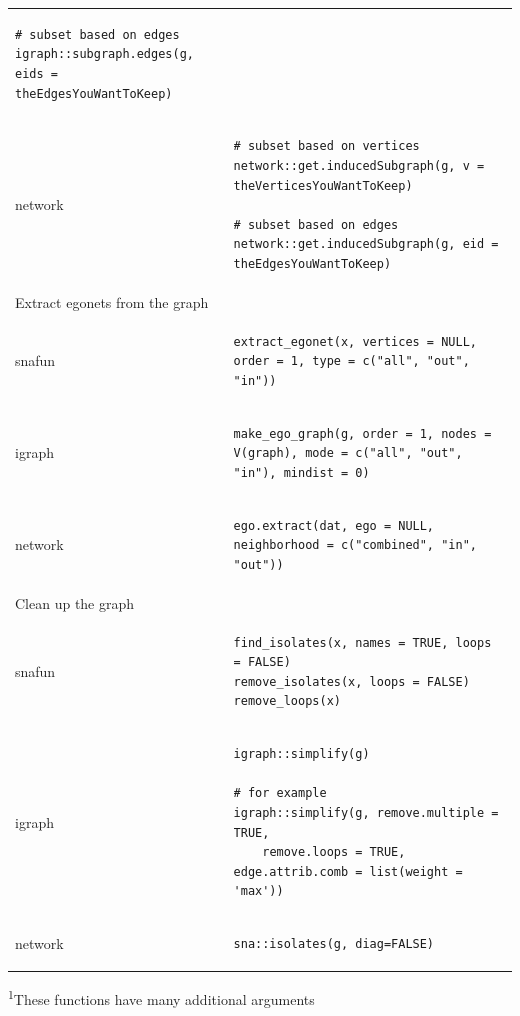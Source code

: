 \documentclass[
]{article}
\begin{document}
\begin{longtable}{ll}
\begin{verbatim}
# subset based on edges
igraph::subgraph.edges(g, eids = theEdgesYouWantToKeep)
\end{verbatim} \\ 
network & \begin{verbatim}
# subset based on vertices
network::get.inducedSubgraph(g, v = theVerticesYouWantToKeep)

# subset based on edges
network::get.inducedSubgraph(g, eid = theEdgesYouWantToKeep)
\end{verbatim} \\ 
\midrule
\multicolumn{1}{l}{Extract egonets from the graph} \\ 
\midrule
snafun & \begin{verbatim}
extract_egonet(x, vertices = NULL, order = 1, type = c("all", "out", "in"))
\end{verbatim} \\ 
igraph & \begin{verbatim}
make_ego_graph(g, order = 1, nodes = V(graph), mode = c("all", "out", "in"), mindist = 0)
\end{verbatim} \\ 
network & \begin{verbatim}
ego.extract(dat, ego = NULL, neighborhood = c("combined", "in", "out"))
\end{verbatim} \\ 
\midrule
\multicolumn{1}{l}{Clean up the graph} \\ 
\midrule
snafun & \begin{verbatim}
find_isolates(x, names = TRUE, loops = FALSE)
remove_isolates(x, loops = FALSE)
remove_loops(x)
\end{verbatim} \\ 
igraph & \begin{verbatim}
igraph::simplify(g)

# for example
igraph::simplify(g, remove.multiple = TRUE,
    remove.loops = TRUE, edge.attrib.comb = list(weight = 'max'))
\end{verbatim} \\ 
network & \begin{verbatim}
sna::isolates(g, diag=FALSE)
\end{verbatim} \\ 
\bottomrule
\end{longtable}
\begin{minipage}{\linewidth}
\textsuperscript{1}These functions have many additional arguments\\
\end{minipage}
\end{document}
